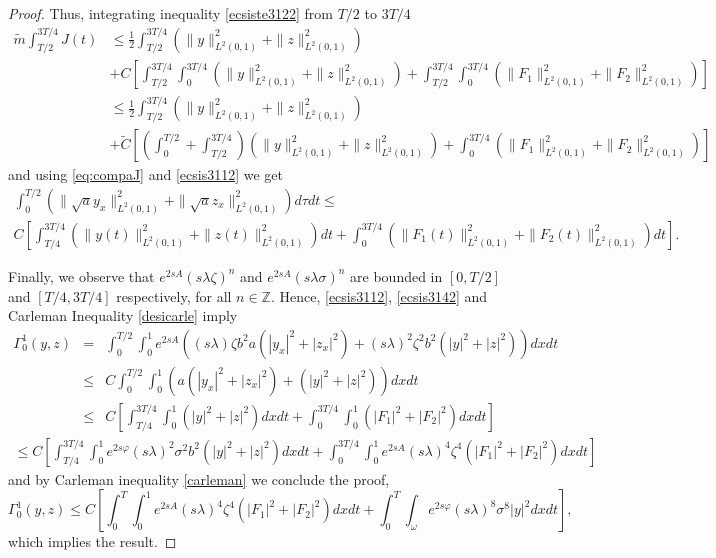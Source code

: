 \documentclass[11pt,oneside,a4papper]{osajnl}
\begin{document}
\begin{proof}
Thus, integrating inequality \eqref{ecsiste3122} from $T/2$ to $3T/4$ 
\begin{align*}
\tilde m \int_{T/2}^{3T/4} J(t)
&\leq \frac{1}{2}\int_{T/2}^{3T/4} \left(\|y\|^2_{L^2(0,1)}+\|z\|^2_{L^2(0,1)}\right)\\
&+C\left[\int_{T/2}^{3T/4} \int_{0}^{3T/4}\left(\|y\|^2_{L^2(0,1)}+\|z\|^2_{L^2(0,1)}\right)+ \int_{T/2}^{3T/4}\int_{0}^{3T/4}\left(\|F_1\|^2_{L^2(0,1)}+\|F_2\|^2_{L^2(0,1)}\right)\right] \\
&\leq \frac{1}{2}\int_{T/2}^{3T/4} \left(\|y\|^2_{L^2(0,1)}+\|z\|^2_{L^2(0,1)}\right)\\
&+\tilde C\left[\left(\int_{0}^{T/2}+ \int_{T/2}^{3T/4} \right)\left(\|y\|^2_{L^2(0,1)}+\|z\|^2_{L^2(0,1)}\right)+ \int_{0}^{3T/4}\left(\|F_1\|^2_{L^2(0,1)}+\|F_2\|^2_{L^2(0,1)}\right)\right]
\end{align*}
and using \eqref{eq:compaJ} and \eqref{ecsis3112} we get
\begin{multline}\label{ecsis3142}
\int_{0}^{T/2}\left(\|\sqrt{a}y_x\|^2_{L^2(0,1)}+\|\sqrt{a}z_x\|^2_{L^2(0,1)}\right)d\tau dt\leq\\
	C\left[\int_{T/4}^{3T/4} \left(\|y(t)\|^2_{L^2(0,1)}+\|z(t)\|^2_{L^2(0,1)}\right)dt+ \int_{0}^{3T/4}\left(\|F_1(t)\|^2_{L^2(0,1)}+\|F_2(t)\|^2_{L^2(0,1)}\right) dt\right].
\end{multline}

Finally, we observe that $e^{2sA}(s\lambda \zeta)^n$ and $e^{2sA}(s\lambda \sigma)^n$ are bounded in $[0, T/2]$ and $[T/4, 3T/4]$ respectively, for all $n\in \mathbb{Z}$. Hence, \eqref{ecsis3112}, \eqref{ecsis3142} and Carleman Inequality \eqref{desicarle} imply
\begin{eqnarray*}
\Gamma^1_0(y,z) &=&\int_{0}^{T/2}\int_{0}^{1} e^{2s A}((s\lambda) \zeta b^2 a (|y_x|^2 + |z_x|^2) + (s\lambda)^2 {\zeta}^2 b^2 (|y|^2 + |z|^2))dxdt\\
&\leq&C\int_{0}^{T/2}\int_{0}^{1} (  a (|y_x|^2 + |z_x|^2) +  (|y|^2 + |z|^2))dxdt\\
&\leq&C\left[\int_{T/4}^{3T/4}\int_{0}^{1} \left(|y|^2+|z|^2\right)dxdt+ \int_{0}^{3T/4}\int_{0}^{1}\left(|F_1|^2+|F_2|^2\right) dxdt\right]
\end{eqnarray*}
\vspace*{-0.6cm}
\begin{multline*}
	\leq C\left[\int_{T/4}^{3T/4}\int_{0}^{1}e^{2s \varphi} (s\lambda)^2 {\sigma}^2 b^2\left(|y|^2+|z|^2\right)dxdt\right.+
	 \left.\int_{0}^{3T/4}\int_{0}^{1}e^{2s A} (s\lambda)^4 {\zeta}^4 \left(|F_1|^2+|F_2|^2\right) dxdt\right]
\end{multline*}
and by Carleman inequality \eqref{carleman} we conclude the proof,
$$\Gamma^1_0(y,z) \leq C\left[\int_{0}^{T}\int_{0}^{1}e^{2s A}(s\lambda)^4 {\zeta}^4 \left(|F_1|^2+|F_2|^2\right) dxdt+
\int_{0}^{T}\int_{\omega}e^{2s \varphi} (s\lambda)^8 {\sigma}^8|y|^2  dxdt\right],$$
which implies the result.
\end{proof}
\end{document}
